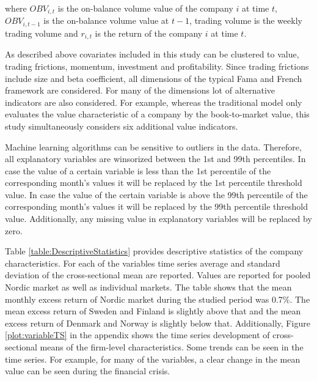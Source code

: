 \documentclass[12pt]{article}
\begin{document}
where $OBV_{i, t}$ is the on-balance volume value of the company $i$ at time $t$, $OBV_{i, t-1}$ is the on-balance volume value at $t-1$, trading volume is the weekly trading volume and $r_{i, t}$ is the return of the company $i$ at time $t$. \par

As described above covariates included in this study can be clustered to value, trading frictions, momentum, investment and profitability. Since trading frictions include size and beta coefficient, all dimensions of the typical Fama and French framework are considered. For many of the dimensions lot of alternative indicators are also considered. For example, whereas the traditional \citet{FAMA19933} model only evaluates the value characteristic of a company by the book-to-market value, this study simultaneously considers six additional value indicators.\footnotemark {} \par

Machine learning algorithms can be sensitive to outliers in the data. Therefore, all explanatory variables are winsorized between the 1st and 99th percentiles. In case the value of a certain variable is less than the 1st percentile of the corresponding month's values it will be replaced by the 1st percentile threshold value. In case the value of the certain variable is above the 99th percentile of the corresponding month's values it will be replaced by the 99th percentile threshold value. %
Additionally, any missing value in explanatory variables will be replaced by zero. \par

Table \ref{table:DescriptiveStatistics} provides descriptive statistics of the company characteristics. For each of the variables time series average and standard deviation of the cross-sectional mean are reported. Values are reported for pooled Nordic market as well as individual markets. The table shows that the mean monthly excess return of Nordic market during the studied period was 0.7\%. The mean excess return of Sweden and Finland is slightly above that and the mean excess return of Denmark and Norway is slightly below that. Additionally, Figure \ref{plot:variableTS} in the appendix shows the time series development of cross-sectional means of the firm-level characteristics. Some trends can be seen in the time series. For example, for many of the variables, a clear change in the mean value can be seen during the financial crisis. 
\end{document}
